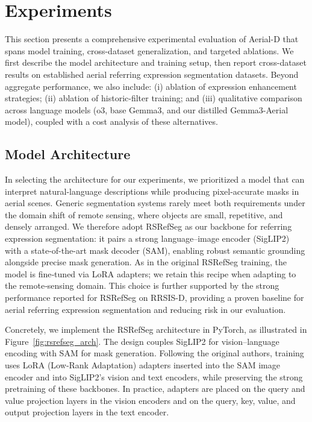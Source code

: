 
\section{Experiments}
\label{sec:experiments}

This section presents a comprehensive experimental evaluation of Aerial-D that spans model training, cross-dataset generalization, and targeted ablations. We first describe the model architecture and training setup, then report cross-dataset results on established aerial referring expression segmentation datasets. Beyond aggregate performance, we also include: (i) ablation of expression enhancement strategies; (ii) ablation of historic-filter training; and (iii) qualitative comparison across language models (o3, base Gemma3, and our distilled Gemma3-Aerial model), coupled with a cost analysis of these alternatives.

\subsection{Model Architecture}
\label{subsec:model_architecture}

In selecting the architecture for our experiments, we prioritized a model that can interpret natural-language descriptions while producing pixel-accurate masks in aerial scenes. Generic segmentation systems rarely meet both requirements under the domain shift of remote sensing, where objects are small, repetitive, and densely arranged. We therefore adopt RSRefSeg as our backbone for referring expression segmentation: it pairs a strong language–image encoder (SigLIP2) with a state-of-the-art mask decoder (SAM), enabling robust semantic grounding alongside precise mask generation. As in the original RSRefSeg training, the model is fine‑tuned via LoRA adapters; we retain this recipe when adapting to the remote‑sensing domain. This choice is further supported by the strong performance reported for RSRefSeg on RRSIS-D\cite{liu2024rotated}, providing a proven baseline for aerial referring expression segmentation and reducing risk in our evaluation.

Concretely, we implement the RSRefSeg architecture\cite{chen2025rsrefseg} in PyTorch, as illustrated in Figure~\ref{fig:rsrefseg_arch}. The design couples SigLIP2\cite{siglip2} for vision–language encoding with SAM\cite{sam} for mask generation. Following the original authors, training uses LoRA (Low‑Rank Adaptation)\cite{lora} adapters inserted into the SAM image encoder and into SigLIP2’s vision and text encoders, while preserving the strong pretraining of these backbones. In practice, adapters are placed on the query and value projection layers in the vision encoders and on the query, key, value, and output projection layers in the text encoder.

